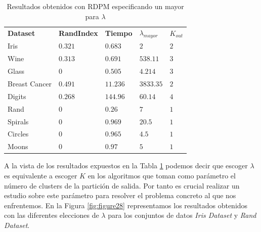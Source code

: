\begin{table}[!h]
	\centering
	\setlength{\arrayrulewidth}{1mm}
	\setlength{\tabcolsep}{10pt}
	\renewcommand{\arraystretch}{0.85}
	
	\begin{tabular}{ >{\centering\arraybackslash}m{2.5cm}  >{\centering\arraybackslash}m{1.8cm}>{\centering\arraybackslash}m{1.5cm}>{\centering\arraybackslash}m{1cm}>{\centering\arraybackslash}m{1cm}}
		\hline
		\rowcolor{black}
		\multicolumn{5}{c}{\bf \color{white}{Resultados obtenidos con RDPM}}\\
		\hline
		\rowcolor{gray!50}
		\textbf{Dataset} & \textbf{RandIndex} & \textbf{Tiempo} & \textbf{$\lambda_{mayor}$} & \textbf{$K_{out}$}  \\
		Iris & $0.321$ & $0.683$ & $2$ & $2$ \\
		Wine & $0.313$ & $0.691$ & $538.11$ & $3$ \\
		Glass & $0$ & $0.505$ & $4.214$ & $3$ \\
		Breast Cancer & $0.491$ & $11.236$ & $3833.35$ & $2$ \\
		Digits & $0.268$ & $144.96$ & $60.14$ & $4$ \\
		Rand & $0$ & $0.26$ & $7$ & $1$ \\
		Spirals & $0$ & $0.969$ & $20.5$ & $1$ \\
		Circles & $0$ & $0.965$ & $4.5$ & $1$  \\
		Moons & $0$ & $0.97$ & $5$ & $1$ \\
		\hline
		
	\end{tabular}
	\caption{Resultados obtenidos con \acs{RDPM} especificando un mayor para $\lambda$}
	\label{tab:tabla11}
\end{table}

A la vista de los resultados expuestos en la Tabla \ref{tab:tabla11} podemos decir que escoger $\lambda$ es equivalente a escoger $K$ en los algoritmos que toman como parámetro el número de clusters de la partición de salida. Por tanto es crucial realizar un estudio sobre este parámetro para resolver el problema concreto al que nos enfrentemos. En la Figura \ref{fig:figure28} representamos los resultados obtenidos con las diferentes elecciones de $\lambda$ para los conjuntos de datos \textit{Iris Dataset} y \textit{Rand Dataset}. 

